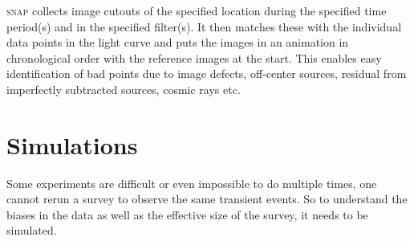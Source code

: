 \documentclass[a4paper,oneside,12pt, class=Latex/Classes/PhDthesisPSnPDF, crop=false]{standalone}
\begin{document}
\textsc{snap} collects image cutouts of the specified location during the  specified time period(s) and in the specified filter(s). It then matches these with the individual data points in the light curve and puts the images in an animation in chronological order with the reference images at the start. This enables easy identification of bad points due to image defects, off-center sources, residual from imperfectly subtracted sources, cosmic rays etc.

\section{Simulations}
Some experiments are difficult or even impossible to do multiple times, one cannot rerun a survey to observe the same transient events. So to understand the biases in the data as well as the effective size of the survey, it needs to be simulated.
\end{document}
